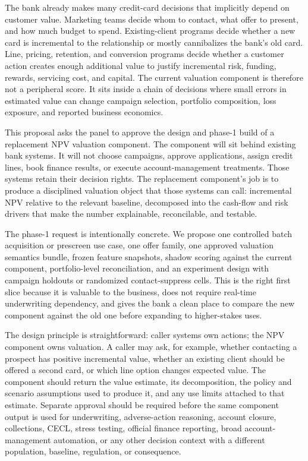 \documentclass[11pt]{article}
\newcommand{\1}{\mathbf{1}}
\begin{document}
The bank already makes many credit-card decisions that implicitly depend on
customer value. Marketing teams decide whom to contact, what offer to present,
and how much budget to spend. Existing-client programs decide whether a new
card is incremental to the relationship or mostly cannibalizes the bank's old
card. Line, pricing, retention, and conversion programs decide whether a
customer action creates enough additional value to justify incremental risk,
funding, rewards, servicing cost, and capital. The current valuation component
is therefore not a peripheral score. It sits inside a chain of decisions where
small errors in estimated value can change campaign selection, portfolio
composition, loss exposure, and reported business economics.

This proposal asks the panel to approve the design and phase-1 build of a
replacement NPV valuation component. The component will sit behind existing
bank systems. It will not choose campaigns, approve applications, assign credit
lines, book finance results, or execute account-management treatments. Those
systems retain their decision rights. The replacement component's job is to
produce a disciplined valuation object that those systems can call: incremental
NPV relative to the relevant baseline, decomposed into the cash-flow and risk
drivers that make the number explainable, reconcilable, and testable.

The phase-1 request is intentionally concrete. We propose one controlled batch
acquisition or prescreen use case, one offer family, one approved valuation
semantics bundle, frozen feature snapshots, shadow scoring against the current
component, portfolio-level reconciliation, and an experiment design with
campaign holdouts or randomized contact-suppress cells. This is the right first
slice because it is valuable to the business, does not require real-time
underwriting dependency, and gives the bank a clean place to compare the new
component against the old one before expanding to higher-stakes uses.

The design principle is straightforward: caller systems own actions; the NPV
component owns valuation. A caller may ask, for example, whether contacting a
prospect has positive incremental value, whether an existing client should be
offered a second card, or which line option changes expected value. The
component should return the value estimate, its decomposition, the policy and
scenario assumptions used to produce it, and any use limits attached to that
estimate. Separate approval should be required before the same component output
is used for underwriting, adverse-action reasoning, account closure,
collections, CECL, stress testing, official finance reporting, broad
account-management automation, or any other decision context with a different
population, baseline, regulation, or consequence.
\end{document}
